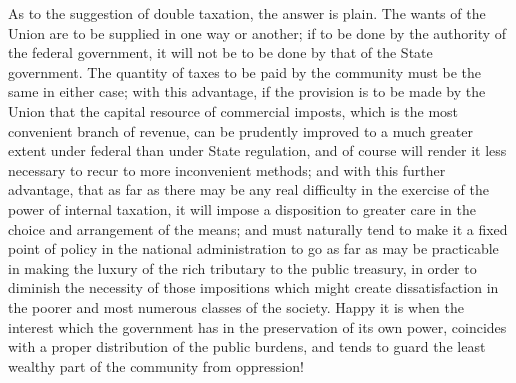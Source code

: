 As to the suggestion of double taxation, the answer is plain. 
The wants of the Union are to be supplied in one way or another; if to be done by the authority of the federal government, it will not be to be done by that of the State government. 
The quantity of taxes to be paid by the community must be the same in either case; with this advantage, if the provision is to be made by the Union that the capital resource of commercial imposts, which is the most convenient branch of revenue, can be prudently improved to a much greater extent under federal than under State regulation, and of course will render it less necessary to recur to more inconvenient methods; and with this further advantage, that as far as there may be any real difficulty in the exercise of the power of internal taxation, it will impose a disposition to greater care in the choice and arrangement of the means; and must naturally tend to make it a fixed point of policy in the national administration to go as far as may be practicable in making the luxury of the rich tributary to the public treasury, in order to diminish the necessity of those impositions which might create dissatisfaction in the poorer and most numerous classes of the society. 
Happy it is when the interest which the government has in the preservation of its own power, coincides with a proper distribution of the public burdens, and tends to guard the least wealthy part of the community from oppression!


